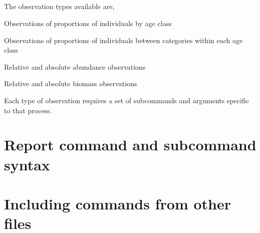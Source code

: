 
\subsection{}

The observation types available are,

\begin{description}
  \item Observations of proportions of individuals by age class
  \item Observations of proportions of individuals between categories within each age class
  \item Relative and absolute abundance observations
  \item Relative and absolute biomass observations
\end{description}

Each type of observation requires a set of subcommands and arguments specific to that process.



\subsection{}


\section{Report command and subcommand syntax\label{sec:report-syntax}}
\subsection{}



\section{Including commands from other files\label{sec:general-syntax}}


